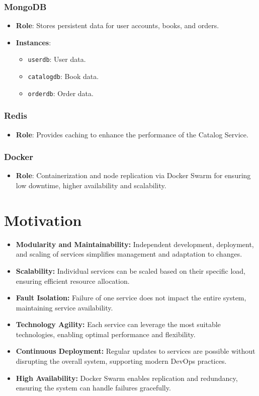 \documentclass{article}
\begin{document}
\subsubsection{MongoDB}
\begin{itemize}
    \item \textbf{Role}: Stores persistent data for user accounts, books, and orders.
    \item \textbf{Instances}:
    \begin{itemize}
        \item \texttt{userdb}: User data.
        \item \texttt{catalogdb}: Book data.
        \item \texttt{orderdb}: Order data.
    \end{itemize}
\end{itemize}

\subsubsection{Redis}
\begin{itemize}
    \item \textbf{Role}: Provides caching to enhance the performance of the Catalog Service.
\end{itemize}

\subsubsection{Docker}
\begin{itemize}
    \item \textbf{Role}: Containerization and node replication via Docker Swarm for ensuring low downtime, higher availability and scalability.
\end{itemize}

\section{Motivation}
\begin{itemize}
    \item \textbf{Modularity and Maintainability:} Independent development, deployment, and scaling of services simplifies management and adaptation to changes.
    \item \textbf{Scalability:} Individual services can be scaled based on their specific load, ensuring efficient resource allocation.
    \item \textbf{Fault Isolation:} Failure of one service does not impact the entire system, maintaining service availability.
    \item \textbf{Technology Agility:} Each service can leverage the most suitable technologies, enabling optimal performance and flexibility.
    \item \textbf{Continuous Deployment:} Regular updates to services are possible without disrupting the overall system, supporting modern DevOps practices.
    \item \textbf{High Availability:} Docker Swarm enables replication and redundancy, ensuring the system can handle failures gracefully. 
\end{itemize}
\end{document}
